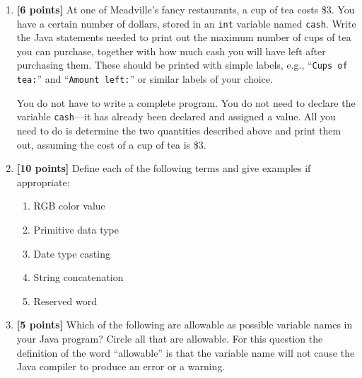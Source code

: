 \documentclass[11pt]{report}
\begin{document}
\begin{enumerate}
\vspace{2in}
\newpage

\item {\bf [6 points]}
At one of Meadville's fancy restaurants, a cup of tea costs
\$3. You have a certain number of dollars, stored in an {\tt int}
variable named {\tt cash}. Write the Java statements needed to
print out the maximum number of cups of tea you can purchase,
together with how much cash you will have left after purchasing them.
These should be printed with simple labels, e.g., ``{\tt Cups of tea:}'' 
and ``{\tt Amount left:}'' or similar labels of your choice.

You do not have to write a complete program. You do not need to declare
the variable {\tt cash}---it has already been declared and assigned a
value. All you need to do is determine the two quantities described
above and print them out,
assuming the cost of a cup of tea is \$3.

\vspace{3in}

\item {\bf [10 points]}
Define each of the following terms and give examples if appropriate:
\begin{enumerate}
\item RGB color value 

\bigskip
\bigskip
\bigskip
\item Primitive data type

\bigskip
\bigskip
\bigskip

\item Date type casting

\bigskip
\bigskip
\bigskip

\item String concatenation 
\bigskip
\bigskip
\bigskip

\item Reserved word 
\bigskip
\bigskip
\bigskip

\end{enumerate}

\item {\bf [5 points]}
Which of the following are allowable as possible variable names in your Java program? Circle all that are allowable.
For this question the definition of the word ``allowable'' is that the variable name will not cause the Java compiler to produce an
error or a warning.


\end{enumerate}
\end{document}
